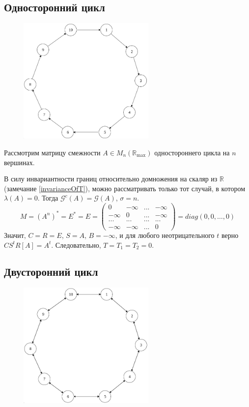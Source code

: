 \documentclass[12pt]{article}
\begin{document}
\subsection{Односторонний цикл}
\begin{figure}[h]
  \centering
    \includegraphics[width=0.6\textwidth]{ForwardCycle}
\end{figure}

Рассмотрим матрицу смежности $A \in M_n(\mathbb{R}_{\max})$ одностороннего цикла на $n$ вершинах.

В силу инвариантности границ относительно домножения на скаляр из $\mathbb{R}$ (замечание \ref{invarianceOfT}), можно рассматривать только тот случай, в котором $\lambda(A) = 0$.
Тогда $\mathcal{G}^c(A) = \mathcal{G}(A)$, $\sigma = n$.
\begin{equation*}
M = (A^n)^* = E^* = E = \begin{pmatrix}
0 & -\infty & ... & -\infty \\
-\infty & 0 & ... & -\infty \\
... & ... & ... & ... \\
-\infty & -\infty & ... & 0
\end{pmatrix} = diag(0, 0, \dots, 0)
\end{equation*}
Значит, $C = R = E$, $S = A$, $B = -\infty$, и для любого неотрицательного $t$ верно $CS^tR[A] = A^t$. Следовательно, $T = T_1 = T_2 = 0$.

\subsection{Двусторонний цикл}
\begin{figure}[h]
  \centering
    \includegraphics[width=0.6\textwidth]{BidirectionalCycle}
\end{figure}
\end{document}
